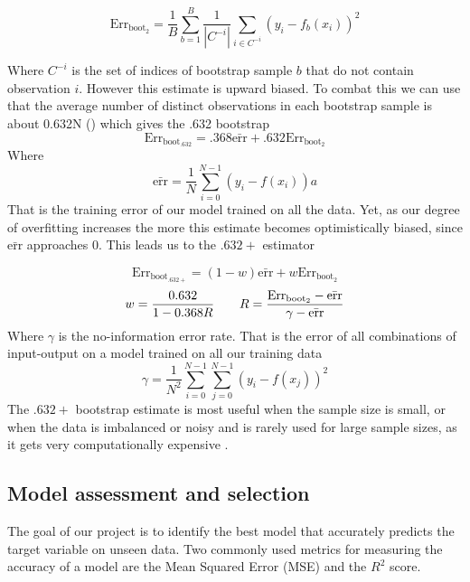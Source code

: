 \documentclass{article}
\begin{document}
\begin{equation*}
    \text{Err}_{\text{boot}_2} =  \frac{1}{B} \sum_{b=1}^B \frac{1}{|C^{-i}|} \sum_{i \in C^{-i}} (y_i - f_b(x_i))^2
\end{equation*}

Where $C^{-i}$ is the set of indices of bootstrap sample $b$ that do not contain observation $i$. However this estimate is upward biased. To combat this we can use that the average number of distinct observations in each bootstrap sample is about 0.632N (\cite[p.~270]{Hastie2009}) which gives the .632 bootstrap
\begin{equation*}
    \text{Err}_{\text{boot}_{.632}} = .368\bar{\text{err}} + .632 \text{Err}_{\text{boot}_2}
\end{equation*}
Where
\begin{equation*}
    \bar{\text{err}} = \frac{1}{N} \sum_{i=0}^{N-1} (y_i - f(x_i))a
\end{equation*}
That is the training error of our model trained on all the data. Yet, as our degree of overfitting increases the more this estimate becomes optimistically biased, since $\bar{\text{err}}$ approaches 0.
This leads us to the $.632+$ estimator

\begin{equation*}
    \text{Err}_{\text{boot}_{.632+}} = (1-w)\bar{\text{err}} + w \text{Err}_{\text{boot}_2}
\end{equation*}
\begin{equation*}
    w  = \frac{0.632}{1-0.368R} \hspace{7mm} R = \frac{\text{Err}_{\text{boot}_2}- \bar{\text{err}}}{\gamma - \bar{\text{err}}}
\end{equation*}
Where $\gamma$ is the no-information error rate. That is the error of all combinations of input-output on a model trained on all our training data
\begin{equation*}
    \gamma = \frac{1}{N^2} \sum_{i= 0}^{N-1}\sum_{j = 0}^{N-1} (y_i - f(x_j))^2
\end{equation*}
The $.632+$ bootstrap estimate is most useful when the sample size is small, or when the data is imbalanced or noisy and is rarely used for large sample sizes, as it gets very computationally expensive \cite[p.~271]{Hastie2009}.

\subsection{Model assessment and selection}
The goal of our project is to identify the best model that accurately predicts the target variable on unseen data. Two commonly used metrics for measuring the accuracy of a model are the Mean Squared Error (MSE) and the $R^2$ score.
\end{document}
